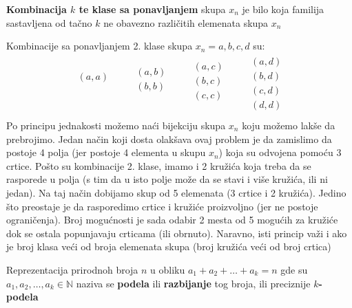 \begin{definition}
	\textbf{Kombinacija $k$ te klase sa ponavljanjem} skupa $x_n$ je bilo koja familija sastavljena od tačno $k$ ne obavezno različitih elemenata skupa $x_n$
\end{definition}
\begin{example}
	Kombinacije sa ponavljanjem 2. klase skupa $x_n = {a,b,c,d}$ su:
	\begin{align*}
		\begin{aligned}
			(a,a)\\
			\\
			\\
			\\
		\end{aligned}
		\quad \quad
		\begin{aligned}
			(a,b)\\
			(b,b)\\
			\\
			\\
		\end{aligned}
		\quad \quad
		\begin{aligned}
			(a,c)\\
			(b,c)\\
			(c,c)\\
			\\
		\end{aligned}
		\quad \quad
		\begin{aligned}
			(a,d)\\
			(b,d)\\
			(c,d)\\
			(d,d)\\
		\end{aligned}
	\end{align*}
	Po principu jednakosti možemo naći bijekciju skupa $x_n$ koju možemo lakše da prebrojimo. Jedan način koji dosta olakšava ovaj problem je da zamislimo da postoje 4 polja (jer postoje 4 elementa u skupu $x_n$) koja su odvojena pomoću 3 crtice. Pošto su kombinacije 2. klase, imamo i 2 kružića koja treba da se rasporede u polja (s tim da u isto polje može da se stavi i više kružića, ili ni jedan). Na taj način dobijamo skup od 5 elemenata (3 crtice i 2 kružića). Jedino što preostaje je da rasporedimo crtice i kružiće proizvoljno (jer ne postoje ograničenja). Broj mogućnosti je sada odabir 2 mesta od 5 mogućih za kružiće dok se ostala popunjavaju crticama (ili obrnuto). Naravno, isti princip važi i ako je broj klasa veći od broja elemenata skupa (broj kružića veći od broj crtica)
\end{example}
\begin{definition}
	Reprezentacija prirodnoh broja $n$ u obliku $a_1+a_2+\ldots+a_k=n$ gde su $a_1, a_2, \ldots, a_k \in \mathbb{N}$ naziva se \textbf{podela} ili \textbf{razbijanje} tog broja, ili preciznije \textbf{$k$-podela}
\end{definition}

